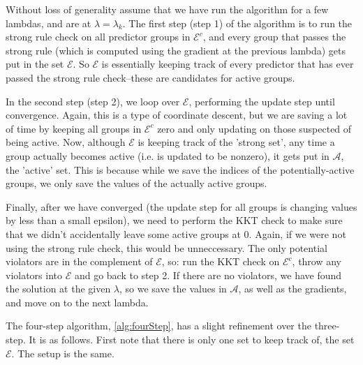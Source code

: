 \documentclass[titlepage]{article}
\begin{document}
Without loss of generality assume that we have run the algorithm for a few lambdas, and are at $\lambda = \lambda_{k}$. The first step (step 1) of the algorithm is to run the strong rule check on all predictor groups in $\mathcal{E}^c$, and every group that passes the strong rule (which is computed using the gradient at the previous lambda) gets put in the set $\mathcal{E}$. So $\mathcal{E}$ is essentially keeping track of every predictor that has ever passed the strong rule check--these are candidates for active groups.

In the second step (step 2), we loop over $\mathcal{E}$, performing the update step until convergence. Again, this is a type of coordinate descent, but we are saving a lot of time by keeping all groups in $\mathcal{E}^c$ zero and only updating on those suspected of being active. Now, although $\mathcal{E}$ is keeping track of the 'strong set', any time a group actually becomes active (i.e. is updated to be nonzero), it gets put in $\mathcal{A}$, the 'active' set. This is because while we save the indices of the potentially-active groups, we only save the values of the actually active groups.

Finally, after we have converged (the update step for all groups is changing values by less than a small epsilon), we need to perform the KKT check to make sure that we didn't accidentally leave some active groups at 0. Again, if we were not using the strong rule check, this would be unneccessary. The only potential violators are in the complement of $\mathcal{E}$, so: run the KKT check on $\mathcal{E}^c$, throw any violators into $\mathcal{E}$ and go back to step 2. If there are no violators, we have found the solution at the given $\lambda$, so we save the values in $\mathcal{A}$, as well as the gradients, and move on to the next lambda.

The four-step algorithm, \autoref{alg:fourStep}, has a slight refinement over the three-step. It is as follows. First note that there is only one set to keep track of, the set $\mathcal{E}$. The setup is the same.
\end{document}
